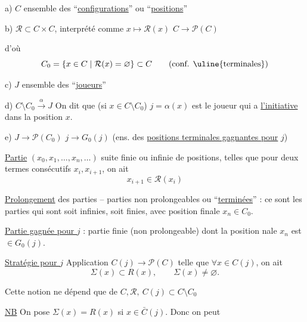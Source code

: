 a) $C$ ensemble des ``\uline{configurations}'' ou ``\uline{positions}''

b) $\mathcal R\subset C\times C$, interprété comme $x\mapsto\mathcal R(x)$ \quad $C\longrightarrow\mathcal P(C)$

d'où
\[
 C_0=\{x\in C\mid\mathcal R(x)=\varnothing\}\subset C\qquad(\text{conf. \uline{terminales}})
\]

c) $J$ ensemble des ``\uline{joueurs}''

d) $C\setminus C_0\xrightarrow{\alpha}J$ \quad On dit que (si $x\in C\setminus C_0$) $j=\alpha(x)$ est le joueur qui a \uline{l'initiative} dans la position $x$.

e) $J\longrightarrow\mathcal P(C_0)$ \qquad $j\longrightarrow G_0(j)$ (ens. des \uline{positions terminales gagnantes pour} $j$)

\uline{Partie} $(x_0,x_1,\ldots,x_n,\ldots)$ suite finie ou infinie de positions, telles que pour deux termes consécutifs $x_i,x_{i+1}$, on ait
\[
 x_{i+1}\in\mathcal R(x_i)
\]

\uline{Prolongement} des parties -- parties non prolongeables ou ``\uline{terminées}'' : ce sont les parties qui sont soit infinies, soit finies, avec  position finale $x_n\in C_0$.


\uline{Partie gagnée pour $j$} : partie finie (non prolongeable) dont la position nale $x_n$ est $\in G_0(j)$.


\uline{Stratégie \inserted{$\Sigma$} pour $j$}  Application \inserted{$\Sigma:$} $C(j)\longrightarrow\mathcal P(C)$ telle que $\forall x\in C(j)$, on ait
\[
 \Sigma(x)\subset R(x),\qquad\Sigma(x)\ne\varnothing .
\]

Cette notion ne dépend que de $C,\mathcal R,\ C(j)\subset C\setminus C_0$

\uline{NB} On pose $\Sigma(x)=R(x)$ si $x\in\bar C(j)$. Donc on peut

